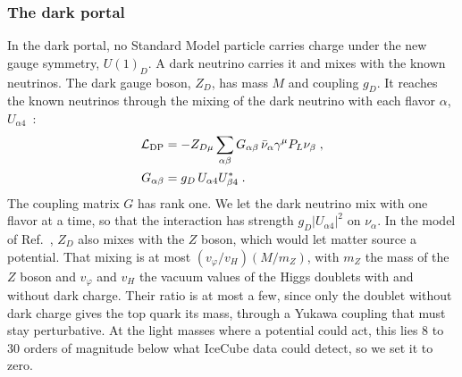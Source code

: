 \documentclass[linenumbers, aps, prd, twocolumn, superscriptaddress, floatfix, longbibliography, nofootinbib, bibnotes]{revtex4-2}
\begin{document}
\subsubsection{The dark portal}
In the dark portal, no Standard Model particle carries charge under the new gauge symmetry, $U(1)_D$.
A dark neutrino carries it and mixes with the known neutrinos.
The dark gauge boson, $Z_D$, has mass $M$ and coupling $g_D$.
It reaches the known neutrinos through the mixing of the dark neutrino with each flavor $\alpha$, $U_{\alpha 4}$~\cite{Bertuzzo:2018itn, Jana:2026pwx}:
\begin{equation}
 \label{equ:lag_dp}
 \begin{split}
 \mathcal{L}_{\rm DP} &= -Z_{D\mu} \sum_{\alpha\beta} G_{\alpha\beta}\, \bar\nu_\alpha \gamma^\mu P_L \nu_\beta \;, \\
 G_{\alpha\beta} &= g_D\, U_{\alpha 4} U^*_{\beta 4} \;.
 \end{split}
\end{equation}
The coupling matrix $G$ has rank one.
We let the dark neutrino mix with one flavor at a time, so that the interaction has strength $g_D |U_{\alpha 4}|^2$ on $\nu_\alpha$.
In the model of Ref.~\cite{Jana:2026pwx}, $Z_D$ also mixes with the $Z$ boson, which would let matter source a potential.
That mixing is at most $(v_\varphi / v_H)(M / m_Z)$, with $m_Z$ the mass of the $Z$ boson and $v_\varphi$ and $v_H$ the vacuum values of the Higgs doublets with and without dark charge.
Their ratio is at most a few, since only the doublet without dark charge gives the top quark its mass, through a Yukawa coupling that must stay perturbative.
At the light masses where a potential could act, this lies 8 to 30 orders of magnitude below what IceCube data could detect, so we set it to zero.
\end{document}

